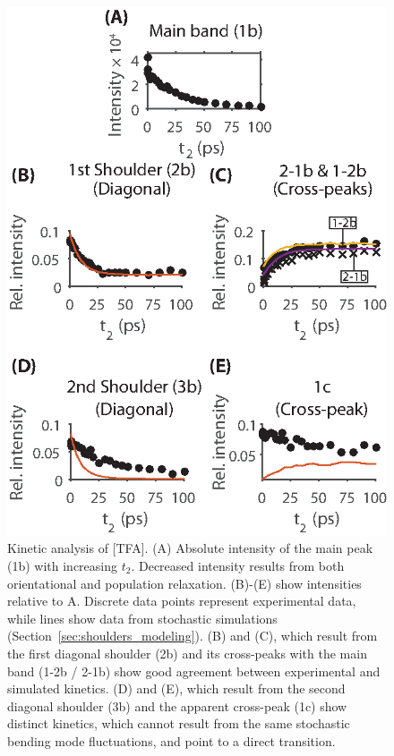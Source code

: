 {\begin{figure}
  \centering
  \includegraphics[scale=1]{./paper_01/fig6.eps}
  \caption[Bending mode kinetics]{\label{fig:shoulder kinetics}Kinetic analysis of \ce{[Im_{4,1}]}[TFA]. (A) Absolute intensity of the main peak (1b) with increasing \(t_2\). Decreased intensity results from both orientational and population relaxation. (B)-(E) show intensities relative to A. Discrete data points represent experimental data, while lines show data from stochastic simulations (Section~\ref{sec:shoulders_modeling}). (B) and (C), which result from the first diagonal shoulder (2b) and its cross-peaks with the main band (1-2b / 2-1b) show good agreement between experimental and simulated kinetics. (D) and (E), which result from the second diagonal shoulder (3b) and the apparent cross-peak (1c) show distinct kinetics, which cannot result from the same stochastic bending mode fluctuations, and point to a direct transition.}
\end{figure}

}
